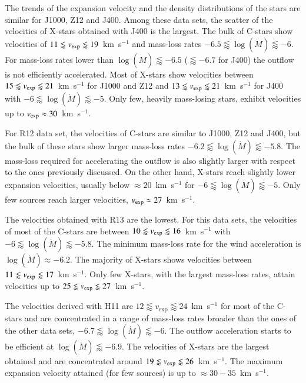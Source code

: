 \documentclass[useAMS,usenatbib]{mn2e/mn2e}
\begin{document}
{The trends of the expansion velocity and the density distributions of the stars are similar for J1000, Z12 and J400. Among these data sets, the scatter of the velocities of X-stars obtained with J400 is the largest. 
The bulk of C-stars show velocities of $11\lessapprox v_{\rm exp}\lessapprox19$~km~s$^{-1}$ and mass-loss rates $-6.5\lessapprox\log(\dot{M})\lessapprox-6$. For mass-loss rates lower than $\log(\dot{M})\lessapprox-6.5$ ($\lessapprox-6.7$ for J400) the outflow is not efficiently accelerated. Most of X-stars show velocities between $15\lessapprox v_{\rm exp}\lessapprox 21$~km~s$^{-1}$ for J1000 and Z12 and $13\lessapprox v_{\rm exp}\lessapprox 21$~km~s$^{-1}$ for J400 with $-6\lessapprox\log(\dot{M})\lessapprox-5$.
Only few, heavily mass-losing stars, exhibit velocities up to $v_{\rm exp}\approx30$~km~s$^{-1}$.

For R12 data set, the velocities of C-stars are similar to J1000, Z12 and J400, but the bulk of these stars show larger mass-loss rates $-6.2\lessapprox\log(\dot{M})\lessapprox-5.8$. The mass-loss required for accelerating the outflow is also slightly larger with respect to the ones previously discussed.
On the other hand, X-stars reach slightly lower expansion velocities, usually below $\approx20$~km~s$^{-1}$ for $-6\lessapprox\log(\dot{M})\lessapprox-5$. Only few sources reach larger velocities, $v_{\rm exp}\approx27$~km~s$^{-1}$. 

The velocities obtained with R13 are the lowest. For this data sets, the velocities of most of the C-stars are between $10\lessapprox v_{\rm exp}\lessapprox 16$~km~s$^{-1}$ with $-6\lessapprox\log(\dot{M})\lessapprox-5.8$. The minimum mass-loss rate for the wind acceleration is $\log(\dot{M})\approx-6.2$. 
The majority of X-stars shows velocities between $11\lessapprox v_{\rm exp}\lessapprox17$~km~s$^{-1}$. 
Only few X-stars, with the largest mass-loss rates, attain velocities up to $25\lessapprox v_{\rm exp}\lessapprox 27$~km~s$^{-1}$.

The velocities derived with H11 are $12\lessapprox v_{\exp}\lessapprox 24$~km~s$^{-1}$ for most of the C-stars and are concentrated in a range of mass-loss rates broader than the ones of the other data sets, $-6.7\lessapprox\log(\dot{M})\lessapprox-6$. The outflow acceleration starts to be efficient at $\log(\dot{M})\lessapprox-6.9$. The velocities of X-stars are the largest obtained and are concentrated around $19\lessapprox v_{\rm exp}\lessapprox 26$~km~s$^{-1}$. 
The maximum expansion velocity attained (for few sources) is up to $\approx 30-35$~km~s$^{-1}$.

}
\end{document}

